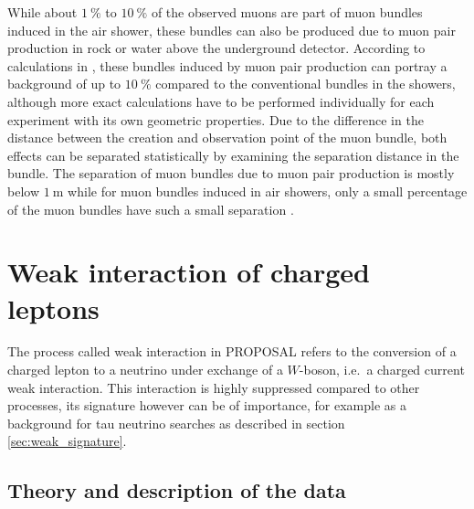 While about $\SI{1}{\percent}$ to $\SI{10}{\percent}$ of the observed muons are part of muon bundles induced in the air shower, these bundles can also be produced due to muon pair production in rock or water above the underground detector.
According to calculations in \cite{MupairInRock}, these bundles induced by muon pair production can portray a background of up to $\SI{10}{\percent}$ compared to the conventional bundles in the showers, although more exact calculations have to be performed individually for each experiment with its own geometric properties.
Due to the difference in the distance between the creation and observation point of the muon bundle, both effects can be separated statistically by examining the separation distance in the bundle.
The separation of muon bundles due to muon pair production is mostly below $\SI{1}{\metre}$ while for muon bundles induced in air showers, only a small percentage of the muon bundles have such a small separation \cite{MupairInRock}.

\section{Weak interaction of charged leptons}

The process called weak interaction in PROPOSAL refers to the conversion of a charged lepton to a neutrino under exchange of a $W$-boson, i.e.\ a charged current weak interaction.
This interaction is highly suppressed compared to other processes, its signature however can be of importance, for example as a background for tau neutrino searches as described in section \ref{sec:weak_signature}.

\subsection{Theory and description of the data}
\label{sec:weak_theory}

